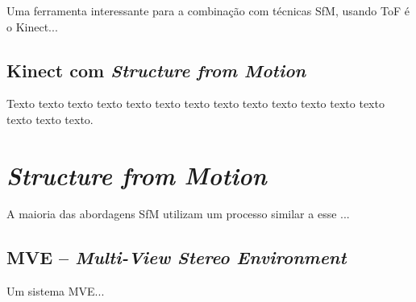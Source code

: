 \documentclass[table, usenames, svgnames, xcolor=dvipsnames]{beamer}
\begin{document}
\begin{frame}
	\begin{center}
    			Uma ferramenta interessante para a combinação com técnicas SfM, usando ToF é o Kinect...
	\end{center}
\end{frame}

\subsection{Kinect com \emph{Structure from Motion}}

\begin{frame} 
	\begin{center}
		Texto texto texto texto texto texto texto texto texto texto texto texto texto
		texto texto texto.
	\end{center}
\end{frame}

\section{\emph{Structure from Motion}}

\begin{frame}
	\begin{center}
		A maioria das abordagens SfM utilizam um processo similar a esse ...
	\end{center}
\end{frame}


\subsection{MVE -- \emph{Multi-View Stereo Environment}}

\begin{frame} 
	\begin{center}
	Um sistema MVE...
	\end{center}
\end{frame}

\end{document}
